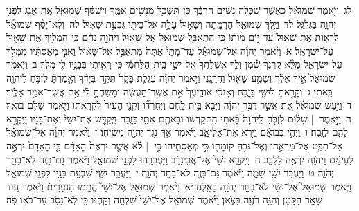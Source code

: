 \documentclass[18pt]{article}
\begin{document}
 {\loc לג~}וַיֹּ֣אמֶר שְׁמוּאֵ֔ל כַּאֲשֶׁ֨ר שִׁכְּלָ֤ה נָשִׁים֙ חַרְבֶּ֔ךָ כֵּן־תִּשְׁכַּ֥ל מִנָּשִׁ֖ים אִמֶּ֑ךָ וַיְשַׁסֵּ֨ף שְׁמוּאֵ֧ל אֶת־אֲגָ֛ג לִפְנֵ֥י יְהֹוָ֖ה בַּגִּלְגָּֽל׃ \startlock
 {\loc לד~}וַיֵּ֥לֶךְ שְׁמוּאֵ֖ל הָרָמָ֑תָה וְשָׁא֛וּל עָלָ֥ה אֶל־בֵּית֖וֹ גִּבְעַ֥ת שָׁאֽוּל׃ \startlock
 {\loc לה~}וְלֹֽא־יָסַ֨ף שְׁמוּאֵ֜ל לִרְא֤וֹת אֶת־שָׁאוּל֙ עַד־י֣וֹם מוֹת֔וֹ כִּֽי־הִתְאַבֵּ֥ל שְׁמוּאֵ֖ל אֶל־שָׁא֑וּל וַיהֹוָ֣ה נִחָ֔ם כִּֽי־הִמְלִ֥יךְ אֶת־שָׁא֖וּל עַל־יִשְׂרָאֵֽל׃ 
\startlock
 {\loc א~}וַיֹּ֨אמֶר יְהֹוָ֜ה אֶל־שְׁמוּאֵ֗ל עַד־מָתַי֙ אַתָּה֙ מִתְאַבֵּ֣ל אֶל־שָׁא֔וּל וַאֲנִ֣י מְאַסְתִּ֔יו מִמְּלֹ֖ךְ עַל־יִשְׂרָאֵ֑ל מַלֵּ֨א קַרְנְךָ֜ שֶׁ֗מֶן וְלֵ֤ךְ אֶֽשְׁלָחֲךָ֙ אֶל־יִשַׁ֣י בֵּֽית־הַלַּחְמִ֔י כִּֽי־רָאִ֧יתִי בְּבָנָ֛יו לִ֖י מֶֽלֶךְ׃ \startlock
 {\loc ב~}וַיֹּ֤אמֶר שְׁמוּאֵל֙ אֵ֣יךְ אֵלֵ֔ךְ וְשָׁמַ֥ע שָׁא֖וּל וַהֲרָגָ֑נִי וַיֹּ֣אמֶר יְהֹוָ֗ה עֶגְלַ֤ת בָּקָר֙ תִּקַּ֣ח בְּיָדֶ֔ךָ וְאָ֣מַרְתָּ֔ לִזְבֹּ֥חַ לַיהֹוָ֖ה בָּֽאתִי׃ \startlock
 {\loc ג~}וְקָרָ֥אתָ לְיִשַׁ֖י בַּזָּ֑בַח וְאָנֹכִ֗י אוֹדִֽיעֲךָ֙ אֵ֣ת אֲשֶֽׁר־תַּעֲשֶׂ֔ה וּמָשַׁחְתָּ֣ לִ֔י אֵ֥ת אֲשֶׁר־אֹמַ֖ר אֵלֶֽיךָ׃ \startlock
 {\loc ד~}וַיַּ֣עַשׂ שְׁמוּאֵ֗ל אֵ֚ת אֲשֶׁ֣ר דִּבֶּ֣ר יְהֹוָ֔ה וַיָּבֹ֖א בֵּ֣ית לָ֑חֶם וַיֶּחֶרְד֞וּ זִקְנֵ֤י הָעִיר֙ לִקְרָאת֔וֹ וַיֹּ֖אמֶר שָׁלֹ֥ם בּוֹאֶֽךָ׃ \startlock
 {\loc ה~}וַיֹּ֣אמֶר  |  שָׁל֗וֹם לִזְבֹּ֤חַ לַֽיהֹוָה֙ בָּ֔אתִי הִֽתְקַדְּשׁ֔וּ וּבָאתֶ֥ם אִתִּ֖י בַּזָּ֑בַח וַיְקַדֵּ֤שׁ אֶת־יִשַׁי֙ וְאֶת־בָּנָ֔יו וַיִּקְרָ֥א לָהֶ֖ם לַזָּֽבַח׃ \startlock
 {\loc ו~}וַיְהִ֣י בְּבוֹאָ֔ם וַיַּ֖רְא אֶת־אֱלִיאָ֑ב וַיֹּ֕אמֶר אַ֛ךְ נֶ֥גֶד יְהֹוָ֖ה מְשִׁיחֽוֹ׃ \startlock
 {\loc ז~}וַיֹּ֨אמֶר יְהֹוָ֜ה אֶל־שְׁמוּאֵ֗ל אַל־תַּבֵּ֧ט אֶל־מַרְאֵ֛הוּ וְאֶל־גְּבֹ֥הַּ קוֹמָת֖וֹ כִּ֣י מְאַסְתִּ֑יהוּ כִּ֣י  |  לֹ֗א אֲשֶׁ֤ר יִרְאֶה֙ הָאָדָ֔ם כִּ֤י הָאָדָם֙ יִרְאֶ֣ה לַעֵינַ֔יִם וַיהֹוָ֖ה יִרְאֶ֥ה לַלֵּבָֽב׃ \startlock
 {\loc ח~}וַיִּקְרָ֤א יִשַׁי֙ אֶל־אֲבִ֣ינָדָ֔ב וַיַּעֲבִרֵ֖הוּ לִפְנֵ֣י שְׁמוּאֵ֑ל וַיֹּ֕אמֶר גַּם־בָּזֶ֖ה לֹא־בָחַ֥ר יְהֹוָֽה׃ \startlock
 {\loc ט~}וַיַּעֲבֵ֥ר יִשַׁ֖י שַׁמָּ֑ה וַיֹּ֕אמֶר גַּם־בָּזֶ֖ה לֹא־בָחַ֥ר יְהֹוָֽה׃ \startlock
 {\loc י~}וַיַּעֲבֵ֥ר יִשַׁ֛י שִׁבְעַ֥ת בָּנָ֖יו לִפְנֵ֣י שְׁמוּאֵ֑ל וַיֹּ֤אמֶר שְׁמוּאֵל֙ אֶל־יִשַׁ֔י לֹא־בָחַ֥ר יְהֹוָ֖ה בָּאֵֽלֶּה׃ \startlock
 {\loc יא~}וַיֹּ֨אמֶר שְׁמוּאֵ֣ל אֶל־יִשַׁי֮ הֲתַ֣מּוּ הַנְּעָרִים֒ וַיֹּ֗אמֶר ע֚וֹד שָׁאַ֣ר הַקָּטָ֔ן וְהִנֵּ֥ה רֹעֶ֖ה בַּצֹּ֑אן וַיֹּ֨אמֶר שְׁמוּאֵ֤ל אֶל־יִשַׁי֙ שִׁלְחָ֣ה וְקָחֶ֔נּוּ כִּ֥י לֹֽא־נָסֹ֖ב עַד־בֹּא֥וֹ פֹֽה׃ \startlock
\end{document}
